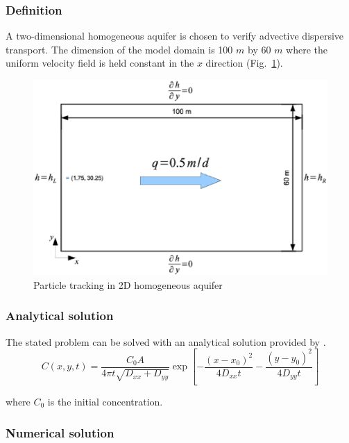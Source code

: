 \subsubsection{Definition}

A two-dimensional homogeneous aquifer is chosen to verify advective dispersive transport. The dimension of the model domain is 100 $m$ by 60 $m$ where the uniform velocity field is held constant in the $x$ direction (Fig.~\ref{ModelSchematic}).

\begin{figure}[htbp!]
\centering
\includegraphics[scale=0.45]{PART_II/C/ModelSchematic.eps}
\caption{Particle tracking in 2D homogeneous aquifer}
\label{ModelSchematic}
\end{figure}

\subsubsection{Analytical solution}

The stated problem can be solved with an analytical solution provided by \cite{aO61}.
\begin{equation}\label{ogata}
C\left( {x,y,t} \right) = \frac{{C_0 A}}{{4\pi t\sqrt {D_{xx} + D_{yy} } }}\exp\left[ { - \frac{{\left( {x - x_0 } \right)^2 }}{{4D_{xx} t}} - \frac{{\left( {y - y_0 } \right)^2 }}{{4D_{yy} t}}} \right]
\end{equation}

where $C_0$ is the initial concentration.

\subsubsection{Numerical solution}

